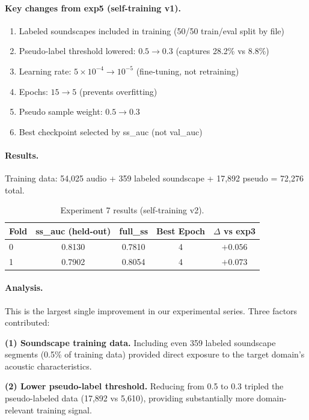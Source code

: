 \paragraph{Key changes from exp5 (self-training v1).}
\begin{enumerate}
    \item Labeled soundscapes included in training (50/50 train/eval split by file)
    \item Pseudo-label threshold lowered: $0.5 \to 0.3$ (captures 28.2\% vs 8.8\%)
    \item Learning rate: $5 \times 10^{-4} \to 10^{-5}$ (fine-tuning, not retraining)
    \item Epochs: $15 \to 5$ (prevents overfitting)
    \item Pseudo sample weight: $0.5 \to 0.3$
    \item Best checkpoint selected by ss\_auc (not val\_auc)
\end{enumerate}

\paragraph{Results.}
Training data: 54,025 audio + 359 labeled soundscape + 17,892 pseudo = 72,276 total.

\begin{table}[h]
\centering
\caption{Experiment 7 results (self-training v2).}
\label{tab:exp7}
\begin{tabular}{lcccc}
\hline
\textbf{Fold} & \textbf{ss\_auc (held-out)} & \textbf{full\_ss} & \textbf{Best Epoch} & \textbf{$\Delta$ vs exp3} \\
\hline
0 & 0.8130 & 0.7810 & 4 & $+0.056$ \\
1 & 0.7902 & 0.8054 & 4 & $+0.073$ \\
\hline
\end{tabular}
\end{table}

\paragraph{Analysis.}
This is the largest single improvement in our experimental series.
Three factors contributed:

\textbf{(1) Soundscape training data.}
Including even 359 labeled soundscape segments (0.5\% of training data)
provided direct exposure to the target domain's acoustic characteristics.

\textbf{(2) Lower pseudo-label threshold.}
Reducing from 0.5 to 0.3 tripled the pseudo-labeled data (17,892 vs 5,610),
providing substantially more domain-relevant training signal.

